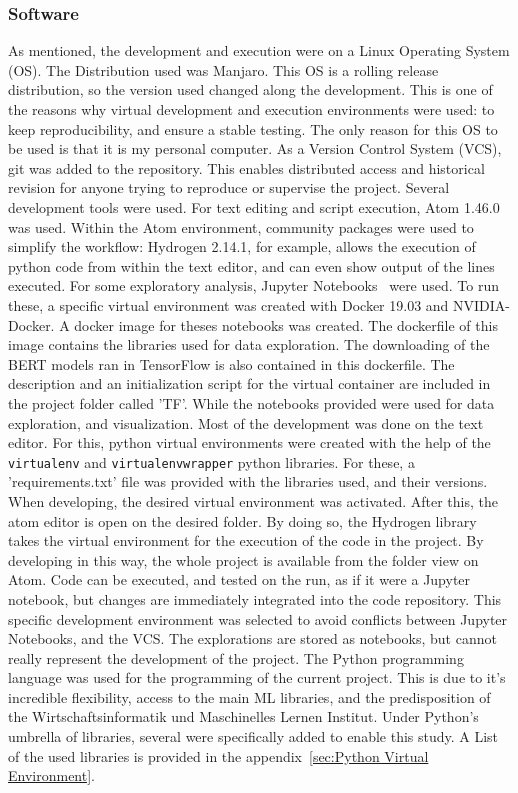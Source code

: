 \subsubsection{Software}\label{subs:Software}
As mentioned, the development and execution were on a Linux Operating System (OS). The Distribution used was Manjaro. This OS is a rolling release distribution, so the version used changed along the development. This is one of the reasons why virtual development and execution environments were used: to keep reproducibility, and ensure a stable testing. The only reason for this OS to be used is that it is my personal computer.
As a Version Control System (VCS), git was added to the repository. This enables distributed access and historical revision for anyone trying to reproduce or supervise the project.
Several development tools were used. For text editing and script execution, Atom 1.46.0 was used. Within the Atom environment, community packages were used to simplify the workflow: Hydrogen 2.14.1, for example, allows the execution of python code from within the text editor, and can even show output of the lines executed.
For some exploratory analysis, Jupyter Notebooks~\cite{kluyver2016jupyter} were used. To run these, a specific virtual environment was created with Docker 19.03 and NVIDIA-Docker. A docker image for theses notebooks was created. The dockerfile of this image contains the libraries used for data exploration. The downloading of the BERT models ran in TensorFlow is also contained in this dockerfile. The description and an initialization script for the virtual container are included in the project folder called 'TF'.
While the notebooks provided were used for data exploration, and visualization. Most of the development was done on the text editor. For this, python virtual environments were created with the help of the \lstinline{virtualenv} and \lstinline{virtualenvwrapper} python libraries. For these, a 'requirements.txt' file was provided with the libraries used, and their versions.
When developing, the desired virtual environment was activated. After this, the atom editor is open on the desired folder. By doing so, the Hydrogen library takes the virtual environment for the execution of the code in the project.
By developing in this way, the whole project is available from the folder view on Atom. Code can be executed, and tested on the run, as if it were a Jupyter notebook, but changes are immediately integrated into the code repository.
This specific development environment was selected to avoid conflicts between Jupyter Notebooks, and the VCS. The explorations are stored as notebooks, but cannot really represent the development of the project.
The Python programming language was used for the programming of the current project. This is due to it's incredible flexibility, access to the main ML libraries, and the predisposition of the Wirtschaftsinformatik und Maschinelles Lernen Institut. Under Python's umbrella of libraries, several were specifically added to enable this study. A List of the used libraries is provided in the appendix~\ref{sec:Python Virtual Environment}.

